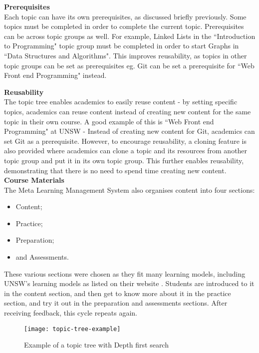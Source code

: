 \textbf{Prerequisites} \\

Each topic can have its own prerequisites, as discussed briefly previously. Some topics must be completed in order to complete the current topic. Prerequisites can be across topic groups as well. For example, Linked Lists in the ``Introduction to Programming" topic group must be completed in order to start Graphs in ``Data Structures and Algorithms". This improves reusability, as topics in other topic groups can be set as prerequisites eg. Git can be set a prerequisite for ``Web Front end Programming" instead.

\textbf{Reusability} \\
The topic tree enables academics to easily reuse content - by setting specific topics, academics can reuse content instead of creating new content for the same topic in their own course. A good example of this is ``Web Front end Programming" at UNSW - Instead of creating new content for Git, academics can set Git as a prerequisite. However, to encourage reusability, a cloning feature is also provided where academics can clone a topic and its resources from another topic group and put it in its own topic group. This further enables reusability, demonstrating that there is no need to spend time creating new content.\\

\textbf{Course Materials} \\
The Meta Learning Management System also organises content into four sections:
\begin{itemize}
    \item Content;
    \item Practice;
    \item Preparation;
    \item and Assessments.
\end{itemize}

These various sections were chosen as they fit many learning models, including UNSW's learning models as listed on their website \cite{learningModel}. Students are introduced to it in the content section, and then get to know more about it in the practice section, and try it out in the preparation and assessments sections. After receiving feedback, this cycle repeats again.\\

\begin{figure}[h!]
    \centering
    \texttt{[image: topic-tree-example]}
    \caption{Example of a topic tree with Depth first search}
\end{figure}

